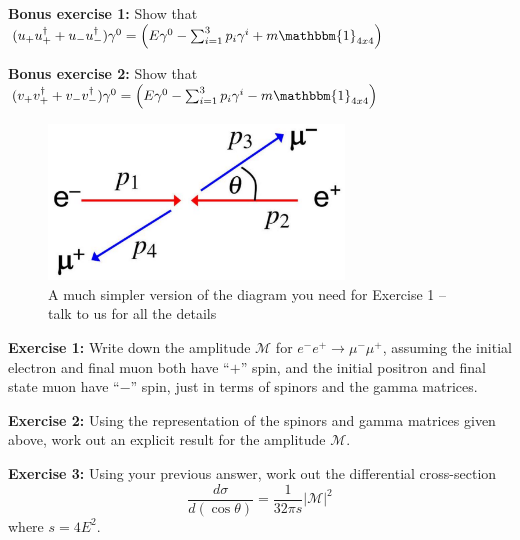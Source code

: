 \documentclass[a4paper,11pt]{article}
\numberwithin{equation}{section} %
\begin{document}
\textbf{Bonus exercise 1:} Show that $(u_+ u_+^\dagger + u_- u_-^\dagger) \gamma^0 = \left( E \gamma^0  - \sum_{i=1}^{3} p_i \gamma^i + m \mathbbm{1}_{4x4} \right)$

\textbf{Bonus exercise 2:} Show that $(v_+ v_+^\dagger + v_- v_-^\dagger) \gamma^0 = \left( E \gamma^0  - \sum_{i=1}^{3} p_i \gamma^i - m \mathbbm{1}_{4x4} \right)$

\begin{figure}
\begin{center}
\includegraphics[width=0.7\textwidth]{scattering.png}
\end{center}
\caption{A much simpler version of the diagram you need for Exercise 1 -- talk to us for all the details}
\end{figure}



\textbf{Exercise 1:} Write down the amplitude $\mathcal{M}$ for $e^- e^+ \to \mu^- \mu^+$, assuming the initial electron and final muon both have ``$+$'' spin, and the initial positron and final state muon have ``$-$'' spin, just in terms of spinors and the gamma matrices.

\textbf{Exercise 2:} Using the representation of the spinors and gamma matrices given above, work out an explicit result for the amplitude $\mathcal{M}$.

\textbf{Exercise 3:} Using your previous answer, work out the differential cross-section
\begin{equation}
\frac{d \sigma}{d (\cos \theta)} = \frac{1}{32 \pi s} |\mathcal{M}|^2
\end{equation}
where $s = 4 E^2$.
\end{document}
